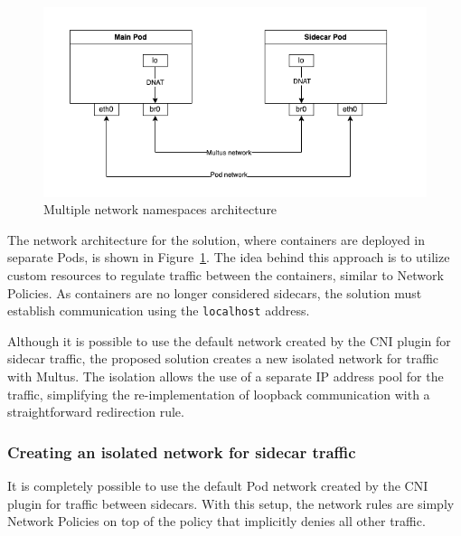 \documentclass[english, 12pt, a4paper, sci, utf8, a-2b, online]{aaltothesis}
\begin{document}

\begin{figure}[h!]
  \centering
  \includegraphics[width=\linewidth]{files/multus.png}
  \caption{Multiple network namespaces architecture}
  \label{fig:multi-pod-net-solution}
\end{figure}

The network architecture for the solution, where containers are deployed in separate Pods, is shown in Figure~\ref{fig:multi-pod-net-solution}.
The idea behind this approach is to utilize custom resources to regulate traffic between the containers, similar to Network Policies.
As containers are no longer considered sidecars, the solution must establish communication using the \lstinline{localhost} address.

Although it is possible to use the default network created by the CNI plugin for sidecar traffic, the proposed solution creates a new isolated network for traffic with Multus.
The isolation allows the use of a separate IP address pool for the traffic, simplifying the re-implementation of loopback communication with a straightforward redirection rule.

\subsubsection{Creating an isolated network for sidecar traffic}

It is completely possible to use the default Pod network created by the CNI plugin for traffic between sidecars.
With this setup, the network rules are simply Network Policies on top of the policy that implicitly denies all other traffic.
\end{document}
